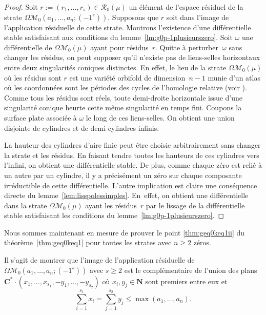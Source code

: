 \documentclass[11pt]{article}
\numberwithin{equation}{section}\renewcommand{\proofname}{Démonstration}
\let\mathcal\mathscr
\newcommand{\CC}{\mathbf{C}}
\newcommand{\NN}{\mathbf{N}}
\newcommand{\espres}[1][g]{\mathcal{R}_{#1}}
\newcommand{\omoduli}[1][g]{{\Omega\mathcal M}_{\!#1}}
\theoremstyle{definition}
\begin{document}
\begin{proof}
Soit $r:=(r_{1},\dots,r_{s})\in\espres[0](\mu)$ un élément de l'espace résiduel de la strate $\omoduli[0](a_{1},\dots,a_{n};(-1^{s}))$.
Supposons que $r$ soit dans l'image de l'application résiduelle de cette strate. Montrons l'existence d'une différentielle stable satisfaisant aux conditions du lemme~\ref{lm:g0p-1plusieurszero}. Soit $\omega$ une différentielle de $\omoduli[0](\mu)$ ayant pour résidus~$r$. Quitte à perturber~$\omega$ sans changer les résidus, on peut supposer qu'il n'existe pas de liens-selles horizontaux entre deux singularités coniques distinctes. En effet, le lieu de la strate $\omoduli[0](\mu)$ où les résidus sont $r$ est une variété orbifold de dimension~$n-1$ munie d'un atlas où les coordonnées sont les périodes des cycles de l'homologie relative (voir \cite{BCGGM3}). Comme tous les résidus sont réels, toute demi-droite horizontale issue d'une singularité conique heurte cette même singularité en temps fini. Coupons la surface plate associée à $\omega$ le long de ces liens-selles. On obtient une union disjointe de cylindres et de demi-cylindres infinis.

La hauteur des cylindres d'aire finie peut être choisie arbitrairement sans changer la strate et les résidus. En faisant tendre toutes les hauteurs de ces cylindres vers l'infini, on obtient une différentielle stable. De plus, comme chaque zéro est relié à un autre par un cylindre, il y a précisément un zéro sur chaque composante irréductible de cette différentielle.
L'autre implication est claire une conséquence directe du lemme~\ref{lem:lisspolessimples}. En~effet, on obtient une différentielle dans la strate $\omoduli[0](\mu)$ ayant les résidus~$r$ par le lissage de la différentielle stable satisfaisant les conditions du lemme~\ref{lm:g0p-1plusieurszero}.
\end{proof}

Nous sommes maintenant en mesure de prouver le point \eqref{thm:geq0keq1ii} du théorème~\ref{thm:geq0keq1} pour toutes les strates avec $n\geq 2$ zéros.

Il s'agit de montrer que l'image de l'application résiduelle de $\omoduli[0](a_{1},\dots,a_{n};\!(-1^{s}))$ avec $s\geq2$ est le complémentaire de l'union des plans $\CC^{\ast} \cdot (x_{1},\dots,x_{s_{1}},-y_{1},\dots,-y_{s_{2}})$ où $x_{i},y_{j} \in \NN$ sont premiers entre eux et\vspace*{-3pt}
\begin{equation*}
\sum_{i=1}^{s_{1}} x_{i} = \sum_{j=1}^{s_{2}} y_{j} \leq \max(a_{1},\dots,a_{n}).
\end{equation*}
\end{document}
